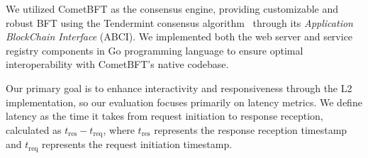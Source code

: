 \documentclass[conference]{IEEEtran}
\begin{document}

We utilized CometBFT as the consensus engine, providing customizable and robust BFT using the Tendermint consensus algorithm~\cite{buchman_latest_2019, buchman_revisiting_2022} through its \textit{Application BlockChain Interface} (ABCI). We implemented both the web server and service registry components in Go programming language to ensure optimal interoperability with CometBFT's native codebase.

Our primary goal is to enhance interactivity and responsiveness through the L2 implementation, so our evaluation focuses primarily on latency metrics. We define latency as the time it takes from request initiation to response reception, calculated as $t_{\text{res}} - t_{\text{req}}$, where $t_{\text{res}}$ represents the response reception timestamp and $t_{\text{req}}$ represents the request initiation timestamp.
\end{document}
